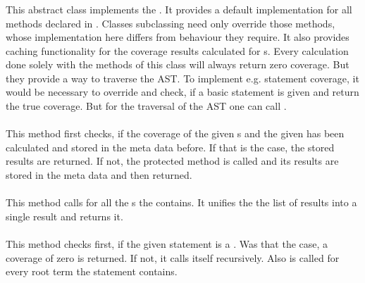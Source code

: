 \subsubsection{} \label{Classes:Metrics:AbstractCoverageMetric}
This abstract class implements the . It provides a default implementation for all methods declared in . Classes subclassing  need only override those methods, whose implementation here differs from behaviour they require. It also provides caching functionality for the coverage results calculated for s. Every calculation done solely with the methods of this class will always return zero coverage. But they provide a way to traverse the AST. To implement e.g. statement coverage, it would be necessary to override  and check, if a basic statement is given and return the true coverage. But for the traversal of the AST one can call . 

\paragraph{} \label{Classes:Metrics:AbstractCoverageMetric:getCoverage_hierarchy}
This method first checks, if the coverage of the given s and the given  has been calculated and stored in the meta data before. If that is the case, the stored results are returned. If not, the protected method   is called and its results are stored in the meta data and then returned.

\paragraph{} \label{Classes:Metrics:AbstractCoverageMetric:getCoverage_statements}
This method calls  for all the s the  contains. It unifies the the list of results into a single result and returns it.

\paragraph{} \label{Classes:Metrics:AbstractCoverageMetric:getCoverage_statement}
This method checks first, if the given statement is a . Was that the case, a coverage of zero is returned. If not, it calls itself recursively. Also  is called for every root term the statement contains.

